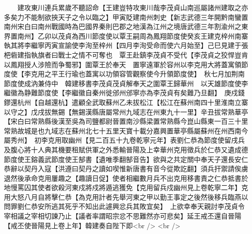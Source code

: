 　　建攻東川連兵累歲不聽詔命【王建豈特攻東川哉李茂貞山南巡屬諸州建取之亦多矣力不能制欲挾天子之令以臨之】甲寅貶建南州刺史【新志武德三年開黔南蠻置南州宋白曰南州戰國時為巴國界秦則巴郡之地漢為江州之境唐武德三年割渝州之東界置南州】乙卯以茂貞為西川節度使以覃王嗣周為鳳翔節度使癸亥王建克梓州南寨執其將李繼寧丙寅宣諭使李洵至梓州【四月李洵受命而使六月始至】己巳見建于張杷砦建指執旗者曰戰士之情不可奪也　覃王赴鎮李茂貞不受代【李茂貞之狡悍豈肯以鳳翔授人涉險而争蜀邪】圍覃王於奉天　置寧遠軍於容州以李克用大將蓋寓領節度使【李克用之平王行瑜也蓋寓以功領容管觀察使今升領節度使】　秋七月加荆南節度使成汭兼侍中　韓建移書李茂貞茂貞解奉天之圍覃王歸華州　以天雄節度使李繼徽為静難節度使【李繼徽自秦州徙邠州邠寧亦為李茂貞有矣難乃旦翻】　庚戍錢鏐還杭州【自越還杭】遣顧全武取蘇州乙未拔松江【松江在蘇州南四十里淮南立寨以守之】戊戌拔無錫【無錫漢縣唐屬常州九域志在州東九十一里】辛丑拔常熟華亭【宋白曰常熟縣後漢至吳為司鹽都尉晉置南沙縣梁置常熟縣今崑山縣東一百三十里常熟故城是也九域志在蘇州北七十五里天寶十載分嘉興置華亭縣屬蘇州在州西南今屬秀州】　初李克用取幽州【見二百五十九卷乾寧元年】表劉仁恭為節度使留戌兵及腹心將十人典其機要租賦供軍之外悉輸晉陽及上幸華州克用徵兵於仁恭又遺成德節度使王鎔義武節度使王郜書【遺唯季翻郜音告】欲與之共定關中奉天子還長安仁恭辭以契丹入寇【洪遵曰契丹之讀如喫惟新唐書有音今從欺訖翻】須兵扞禦請俟虜退然後承命克用屢趣之【趣讀日促】使者相繼數月兵不出克用移書責之仁恭抵書於地慢罵囚其使者欲殺河東戍將戍將遁逃獲免【克用留兵戍幽州見上卷乾寧二年】克用大怒八月自將擊仁恭【為克用計者先舉河東之甲以勤王事定之後然後移兵臨燕以問罪劉仁恭安所逃其死乎不知出此遽興忿兵其敗宜矣】　上欲幸奉天親討李茂貞令宰相議之宰相切諫乃止【議者率謂昭宗忿不思難然亦可悲矣】延王戒丕還自晉陽【戒丕使晉陽見上卷上年】韓建奏自陛下即<br />
<br />
